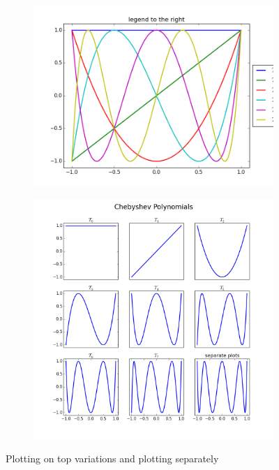\begin{figure}
\begin{subfigure}{.2\textwidth}
  \includegraphics[width=\textwidth]{PoT_legend.png}
\end{subfigure}%
\begin{subfigure}{.2\textwidth}
\centering
  \includegraphics[width=\textwidth]{PoT_separate.png}
\end{subfigure}

\caption{Plotting on top variations and plotting separately}
\label{fig:PoT}
\end{figure}



